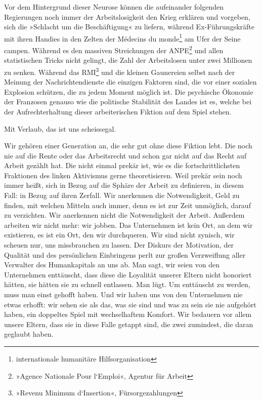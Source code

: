 Vor dem Hintergrund dieser Neurose können die aufeinander folgenden
Regierungen noch immer der Arbeitslosigkeit den Krieg erklären und
vorgeben, sich die »Schlacht um die Beschäftigung« zu liefern,
während Ex-Führungs\-kräfte mit ihren Handies in den Zelten der
Médecins du monde\footnote{
internationale humanitäre Hilfsorganisation
}
am Ufer der Seine campen. Während es den
massiven Streichungen der ANPE\footnote{
»Agence Nationale Pour l‘Emploi«, Agentur für Arbeit
}
und allen statistischen Tricks
nicht gelingt, die Zahl der Arbeitslosen unter zwei Millionen zu
senken. Während das RMI\footnote{
»Revenu Minimum d‘Insertion«, Fürsorgezahlungen
}
und die kleinen Gaunereien selbst nach
der Meinung der Nachrichtendienste die einzigen Faktoren sind, die
vor einer sozialen Explosion schützen, die zu jedem Moment möglich
ist. Die psychische Ökonomie der Franzosen genauso wie die
politische Stabilität des Landes ist es, welche bei der
Aufrechterhaltung dieser arbeiterischen Fiktion auf dem Spiel
stehen.

Mit Verlaub, das ist uns scheissegal.

Wir gehören einer Generation an, die sehr gut ohne diese Fiktion
lebt. Die noch nie auf die Rente oder das Arbeitsrecht und schon
gar nicht auf das Recht auf Arbeit gezählt hat. Die nicht einmal
prekär ist, wie es die fortschrittlichsten Fraktionen des linken
Aktivismus gerne theoretisieren. Weil prekär sein noch immer heißt,
sich in Bezug auf die Sphäre der Arbeit zu definieren, in diesem
Fall: in Bezug auf ihren Zerfall. Wir anerkennen die Notwendigkeit,
Geld zu finden, mit welchen Mitteln auch immer, denn es ist zur
Zeit unmöglich, darauf zu verzichten. Wir anerkennen nicht die
Notwendigkeit der Arbeit. Außerdem arbeiten wir nicht mehr: wir
jobben. Das Unternehmen ist kein Ort, an dem wir existieren, es ist
ein Ort, den wir durchqueren. Wir sind nicht zynisch, wir scheuen
nur, uns missbrauchen zu lassen. Der Diskurs der Motivation, der
Qualität und des persönlichen Einbringens perlt zur großen
Verzweiflung aller Verwalter des Humankapitals an uns ab. Man sagt,
wir seien von den Unternehmen enttäuscht, dass diese die Loyalität
unserer Eltern nicht honoriert hätten, sie hätten sie zu schnell
entlassen. Man lügt. Um enttäuscht zu werden, muss man einst
gehofft haben. Und wir haben uns von den Unternehmen nie etwas
erhofft: wir sehen sie als das, was sie sind und was zu sein sie
nie aufgehört haben, ein doppeltes Spiel mit wechselhaftem Komfort.
Wir bedauern vor allem unsere Eltern, dass sie in diese Falle
getappt sind, die zwei zumindest, die daran geglaubt haben.

